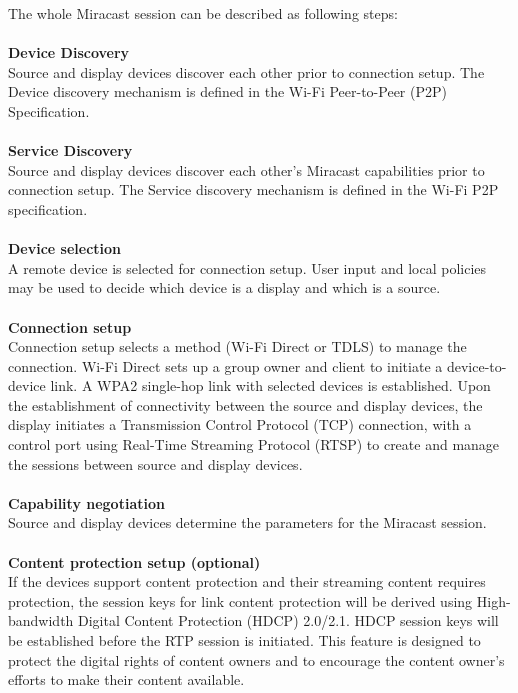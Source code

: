 The whole Miracast session can be described as following steps:\\
\\
\textbf{Device Discovery}\\
Source and display devices discover each other prior to connection setup. The Device discovery mechanism is defined in the Wi-Fi Peer-to-Peer (P2P) Specification. \\
\\
\textbf{Service Discovery}\\
Source and display devices discover each other's Miracast capabilities prior to connection setup. The Service discovery mechanism is defined in the Wi-Fi P2P specification. \\
\\
\textbf{Device selection}\\
A remote device is selected for connection setup. User input and local policies may be used to decide which device is a display and which is a source. \\
\\
\textbf{Connection setup} \\
Connection setup selects a method (Wi-Fi Direct or TDLS) to manage the connection. Wi-Fi Direct sets up a group owner and client to initiate a device-to-device link. A WPA2 single-hop link with selected devices is established. Upon the establishment of connectivity between the source and display devices, the display initiates a Transmission Control Protocol (TCP) connection, with a control port using Real-Time Streaming Protocol (RTSP) to create and manage the sessions between source and display devices. \\ 
\\
\textbf{Capability negotiation} \\
Source and display devices determine the parameters for the Miracast session. \\ 
\\  
\textbf{Content protection setup (optional)}\\
If the devices support content protection and their streaming content requires
protection, the session keys for link content protection will be derived using High-bandwidth Digital Content Protection (HDCP) 2.0/2.1. HDCP session keys will be established before the RTP session is initiated. This feature is designed to protect the digital rights of content owners and to encourage the content owner's efforts to make their content available. \\
\\
